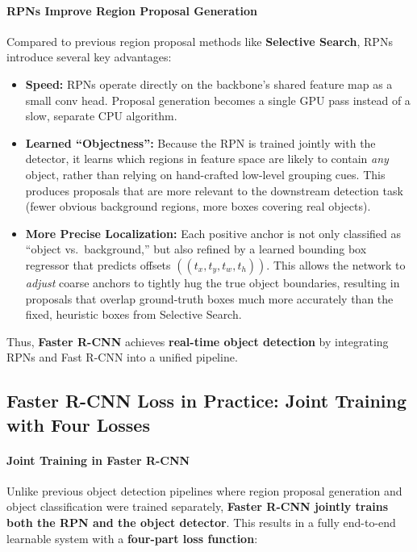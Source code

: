 \newpage

\paragraph{\textbf{RPNs Improve Region Proposal Generation}}
Compared to previous region proposal methods like \textbf{Selective Search}, RPNs introduce several key advantages:
\begin{itemize}
	\item \textbf{Speed:} RPNs operate directly on the backbone’s shared feature map as a small conv head. Proposal generation becomes a single GPU pass instead of a slow, separate CPU algorithm.
	\item \textbf{Learned ``Objectness'':} Because the RPN is trained jointly with the detector, it learns which regions in feature space are likely to contain \emph{any} object, rather than relying on hand-crafted low-level grouping cues. This produces proposals that are more relevant to the downstream detection task (fewer obvious background regions, more boxes covering real objects).
	\item \textbf{More Precise Localization:} Each positive anchor is not only classified as “object vs.\ background,” but also refined by a learned bounding box regressor that predicts offsets $((t_x, t_y, t_w, t_h))$. This allows the network to \emph{adjust} coarse anchors to tightly hug the true object boundaries, resulting in proposals that overlap ground-truth boxes much more accurately than the fixed, heuristic boxes from Selective Search.
\end{itemize}

Thus, \textbf{Faster R-CNN} achieves \textbf{real-time object detection} by integrating RPNs and Fast R-CNN into a unified pipeline.

\subsection{Faster R-CNN Loss in Practice: Joint Training with Four Losses}
\label{subsec:chapter14_faster_rcnn_loss}

\paragraph{\textbf{Joint Training in Faster R-CNN}}
Unlike previous object detection pipelines where region proposal generation and object classification were trained separately, \textbf{Faster R-CNN jointly trains both the RPN and the object detector}. This results in a fully end-to-end learnable system with a \textbf{four-part loss function}:

